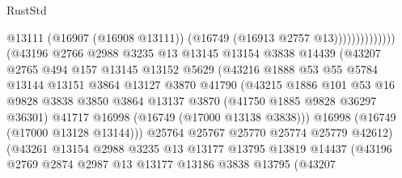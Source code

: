 \begin{lexlean}{RustStd}
\begin{coremodule}
                                              @13111
                                              (@16907 (@16908 @13111))
                                              (@16749 (@16913 @2757 @13))))))))))))))
                      (@43196
                        @2766
                        @2988
                        @3235
                        @13
                        @13145
                        @13154
                        @3838
                        @14439
                        (@43207
                          @2765
                          @494
                          @157
                          @13145
                          @13152
                          @5629
                          (@43216
                            @1888
                            @53
                            @55
                            @5784
                            @13144
                            @13151
                            @3864
                            @13127
                            @3870
                            @41790
                            (@43215
                              @1886
                              @101
                              @53
                              @16
                              @9828
                              @3838
                              @3850
                              @3864
                              @13137
                              @3870
                              (@41750 @1885 @9828 @36297 @36301)
                              @41717
                              @16998
                              (@16749 (@17000 @13138 @3838)))
                            @16998
                            (@16749 (@17000 @13128 @13144)))
                          @25764
                          @25767
                          @25770
                          @25774
                          @25779
                          @42612)
                        (@43261
                          @13154
                          @2988
                          @3235
                          @13
                          @13177
                          @13795
                          @13819
                          @14437
                          (@43196
                            @2769
                            @2874
                            @2987
                            @13
                            @13177
                            @13186
                            @3838
                            @13795
                            (@43207

\end{coremodule}
\end{lexlean}
